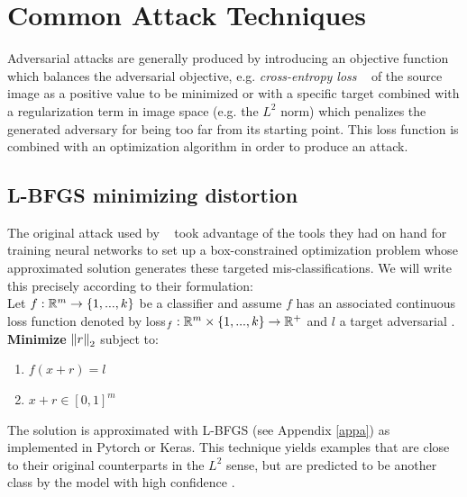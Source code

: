 \section{Common Attack Techniques}
Adversarial attacks are generally produced by introducing an objective
function which balances the adversarial objective, e.g. \emph{cross-entropy
loss} ~\cite{cross entropy loss} of the source image as a positive
value to be minimized or with a specific target combined with a
regularization term in image space (e.g. the $L^2$ norm) which
penalizes the generated adversary for being too far from its starting
point. This loss function is combined with an optimization algorithm
in order to produce an attack. 


\subsection{L-BFGS minimizing distortion}\label{lbfgs}

The original attack used by ~\cite{szegedy2013} took advantage of the
tools they had on  hand for training neural networks to set up a
box-constrained optimization problem whose approximated solution
generates these targeted mis-classifications. We will write this
precisely according to their formulation: \\

Let $f : \mathbb{R}^m \to \{1,...,k\}$ be a classifier and assume $f$ has an associated continuous loss function denoted by loss$_f : \mathbb{R}^m \times \{1,...,k\} \to \mathbb{R}^+$ and $l$ a target adversarial . \\
\textbf{ Minimize} $\left\Vert r \right\Vert_2$ subject to:
\begin{enumerate}[1.]
\item $f(x + r) = l$
\item $x + r \in [0,1]^m$
\end{enumerate}

The solution is approximated with L-BFGS (see Appendix \ref{appa}) as
implemented in Pytorch or Keras. This technique yields examples that
are close to their original counterparts in the $L^2$ sense, but are
predicted to be another class by the model with high confidence .  \\



